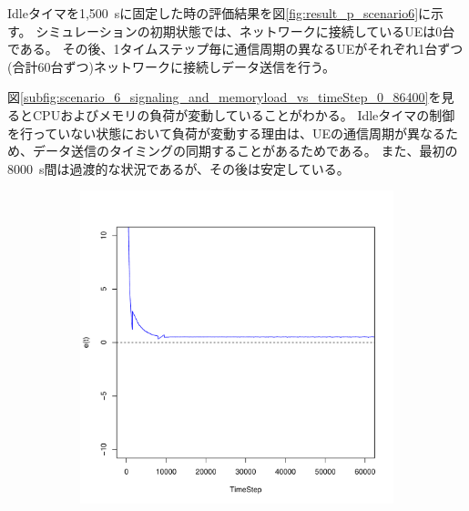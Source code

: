 \documentclass[a4j]{ujarticle}
\begin{document}
\clearpage
Idleタイマを1,500~sに固定した時の評価結果を図\ref{fig:result_p_scenario6}に示す。
シミュレーションの初期状態では、ネットワークに接続しているUEは0台である。
その後、1タイムステップ毎に通信周期の異なるUEがそれぞれ1台ずつ(合計60台ずつ)ネットワークに接続しデータ送信を行う。

図\ref{subfig:scenario_6_signaling_and_memoryload_vs_timeStep_0_86400}を見るとCPUおよびメモリの負荷が変動していることがわかる。
Idleタイマの制御を行っていない状態において負荷が変動する理由は、UEの通信周期が異なるため、データ送信のタイミングの同期することがあるためである。
また、最初の8000~s間は過渡的な状況であるが、その後は安定している。

\begin{figure}[htbp]
 \centering
 \begin{subfigure}{0.49\hsize}
   \centering
   \includegraphics[width=1.0\hsize]{scenario_6_e_0_86400.pdf}
   \label{subfig:scenario_6_e_0_86400}
 \end{subfigure}
 \begin{subfigure}{0.49\hsize}
   \centering

\end{subfigure}
\end{figure}
\end{document}
